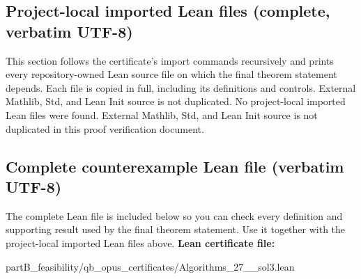 \documentclass[11pt]{article}
\begin{document}
\subsection*{Project-local imported Lean files (complete, verbatim UTF-8)}
This section follows the certificate's import commands recursively and prints every repository-owned Lean source file on which the final theorem statement depends. Each file is copied in full, including its definitions and controls. External Mathlib, Std, and Lean Init source is not duplicated.
No project-local imported Lean files were found. External Mathlib, Std, and Lean Init source is not duplicated in this proof verification document.
\subsection*{Complete counterexample Lean file (verbatim UTF-8)}
The complete Lean file is included below so you can check every definition and supporting result used by the final theorem statement. Use it together with the project-local imported Lean files above.
\textbf{Lean certificate file:}
\begin{Vsrc}
partB_feasibility/qb_opus_certificates/Algorithms_27__sol3.lean
\end{Vsrc}
\end{document}
